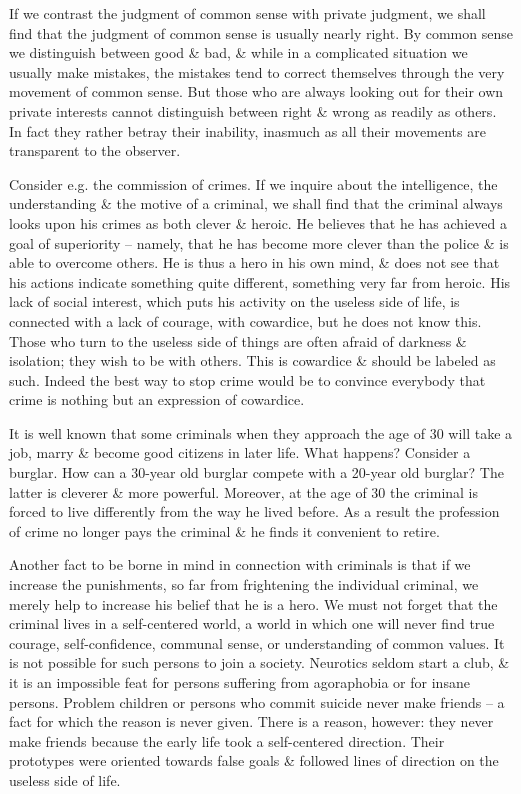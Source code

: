 \documentclass{article}
\begin{document}
If we contrast the judgment of common sense with private judgment, we shall find that the judgment of common sense is usually nearly right. By common sense we distinguish between good \& bad, \& while in a complicated situation we usually make mistakes, the mistakes tend to correct themselves through the very movement of common sense. But those who are always looking out for their own private interests cannot distinguish between right \& wrong as readily as others. In fact they rather betray their inability, inasmuch as all their movements are transparent to the observer.

Consider e.g. the commission of crimes. If we inquire about the intelligence, the understanding \& the motive of a criminal, we shall find that the criminal always looks upon his crimes as both clever \& heroic. He believes that he has achieved a goal of superiority -- namely, that he has become more clever than the police \& is able to overcome others. He is thus a hero in his own mind, \& does not see that his actions indicate something quite different, something very far from heroic. His lack of social interest, which puts his activity on the useless side of life, is connected with a lack of courage, with cowardice, but he does not know this. Those who turn to the useless side of things are often afraid of darkness \& isolation; they wish to be with others. This is cowardice \& should be labeled as such. Indeed the best way to stop crime would be to convince everybody that crime is nothing but an expression of cowardice.

It is well known that some criminals when they approach the age of 30 will take a job, marry \& become good citizens in later life. What happens? Consider a burglar. How can a 30-year old burglar compete with a 20-year old burglar? The latter is cleverer \& more powerful. Moreover, at the age of 30 the criminal is forced to live differently from the way he lived before. As a result the profession of crime no longer pays the criminal \& he finds it convenient to retire.

Another fact to be borne in mind in connection with criminals is that if we increase the punishments, so far from frightening the individual criminal, we merely help to increase his belief that he is a hero. We must not forget that the criminal lives in a self-centered world, a world in which one will never find true courage, self-confidence, communal sense, or understanding of common values. It is not possible for such persons to join a society. Neurotics seldom start a club, \& it is an impossible feat for persons suffering from agoraphobia or for insane persons. Problem children or persons who commit suicide never make friends -- a fact for which the reason is never given. There is a reason, however: they never make friends because the early life took a self-centered direction. Their prototypes were oriented towards false goals \& followed lines of direction on the useless side of life.
\end{document}
